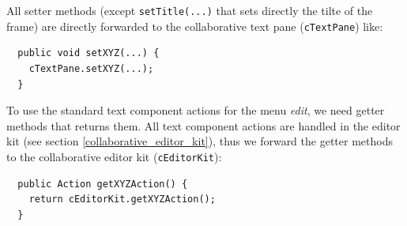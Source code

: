 All setter methods (except \texttt{setTitle(...)} that sets directly the tilte of the frame) are directly forwarded to the collaborative text pane (\texttt{cTextPane}) like:
\begin{verbatim}
  public void setXYZ(...) {
    cTextPane.setXYZ(...);
  }
\end{verbatim}

To use the standard text component actions for the menu \textit{edit}, we need getter methods that returns them. All text component actions are handled in the editor kit (see section \ref{collaborative_editor_kit}), thus we forward the getter methods to the collaborative editor kit (\texttt{cEditorKit}):
\begin{verbatim}
  public Action getXYZAction() {
    return cEditorKit.getXYZAction();
  }
\end{verbatim}



